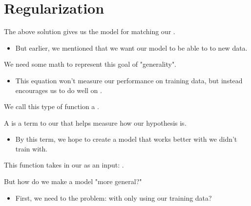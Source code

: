         
\pagebreak

\section{Regularization}

    The above solution gives us the  model for matching our .

    \begin{itemize}
        \item But earlier, we mentioned that we want our model to be able to  to new data.
    \end{itemize}

    We need some math to represent this goal of "generality".

    \begin{itemize}
        \item This equation won't measure our performance on training data, but instead encourages us to do well on .
    \end{itemize}
        
    We call this type of function a .\\
    
    \begin{definition}
        A  is a term to our  that helps measure how  our hypothesis is.

        \begin{itemize}
            \item By  this term, we hope to create a model that works better with  we didn't train with.
        \end{itemize}
        
        This function takes in our  \gren{$\Theta$} as an input: .
    \end{definition}

    But how do we make a model "more general?"

    \begin{itemize}
        \item First, we need to  the problem:  with only using our training data?
        
    \end{itemize}


